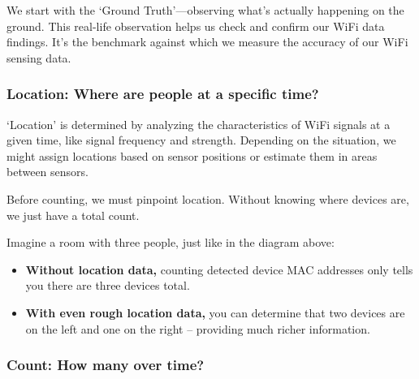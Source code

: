 \documentclass[
  letterpaper,
]{scrbook}
\providecommand{\tightlist}{%
  \setlength{\itemsep}{0pt}\setlength{\parskip}{0pt}}\usepackage{longtable,booktabs,array}
\begin{document}
We start with the `Ground Truth'---observing what's actually happening
on the ground. This real-life observation helps us check and confirm our
WiFi data findings. It's the benchmark against which we measure the
accuracy of our WiFi sensing data.

\hypertarget{location-where-are-people-at-a-specific-time}{%
\subsubsection*{\texorpdfstring{\textbf{Location: Where are people at a
specific
time?}}{Location: Where are people at a specific time?}}\label{location-where-are-people-at-a-specific-time}}

`Location' is determined by analyzing the characteristics of WiFi
signals at a given time, like signal frequency and strength. Depending
on the situation, we might assign locations based on sensor positions or
estimate them in areas between sensors.

\begin{tcolorbox}[enhanced jigsaw, left=2mm, coltitle=black, colframe=quarto-callout-note-color-frame, bottomrule=.15mm, colback=white, bottomtitle=1mm, breakable, colbacktitle=quarto-callout-note-color!10!white, titlerule=0mm, toptitle=1mm, arc=.35mm, rightrule=.15mm, opacityback=0, title=\textcolor{quarto-callout-note-color}{\faInfo}\hspace{0.5em}{Why Location Comes Before Count}, toprule=.15mm, leftrule=.75mm, opacitybacktitle=0.6]

Before counting, we must pinpoint location. Without knowing where
devices are, we just have a total count.

Imagine a room with three people, just like in the diagram above:

\begin{itemize}
\tightlist
\item
  \textbf{Without location data,} counting detected device MAC addresses
  only tells you there are three devices total.
\item
  \textbf{With even rough location data,} you can determine that two
  devices are on the left and one on the right -- providing much richer
  information.
\end{itemize}

\end{tcolorbox}

\hypertarget{count-how-many-over-time}{%
\subsubsection*{\texorpdfstring{\textbf{Count: How many over
time?}}{Count: How many over time?}}\label{count-how-many-over-time}}
\end{document}
